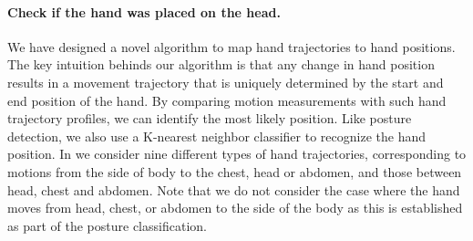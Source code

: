 \paragraph{Check if the hand was placed on the head.}

We have designed a novel algorithm to map hand trajectories to  hand positions. The key intuition behinds our algorithm is that any change
in hand position results in a movement trajectory that is uniquely determined by the start and end position of the hand. By comparing
motion measurements with such hand trajectory profiles, we can identify the most likely position. Like posture detection, we also use a
K-nearest neighbor classifier to recognize the hand position. In \systemname we consider nine different types of hand trajectories,
corresponding to motions from the side of body to the chest, head or abdomen, and those between head, chest and abdomen. Note that we do
not consider the case where the hand moves from head, chest, or abdomen to the side of the body as this is established as part of the
posture classification.

